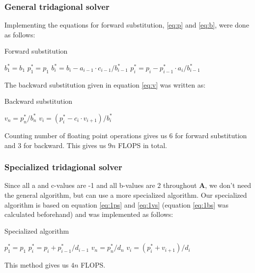 \documentclass[12pt,a4paper]{article}
\newcommand{\s}{^{*}}
\newcommand{\V}[1]{\mathbf{#1}}
\begin{document}
\subsubsection*{General tridagional solver}
Implementing the equations for forward substitution, \eqref{eq:p} and \eqref{eq:b}, were done as follows: 
\begin{algorithm}[H]
\small
\caption{Forward substitution}\label{alg:tri_forward}
\begin{algorithmic}[1]
\State $b_1^* = b_1$
\State $p_1^* = p_1$
\State $b_i^* = b_i - a_{i-1}\cdot c_{i-1}/b_{i-1}^*$
\State $p_i^* = p_i - p_{i-1}^*\cdot a_i/b_{i-1}^*$
\EndFor
\end{algorithmic}
\end{algorithm}
The backward substitution given in equation \eqref{eq:v} was written as:
\begin{algorithm}[H]
\small
\caption{Backward substitution}\label{alg:tri_backward}
\begin{algorithmic}[1]
\State $v_n = p_n\s/b_n\s$
\State $v_i = (p_i\s - c_i \cdot v_{i+1})/b_i\s$
\EndFor
\end{algorithmic}
\end{algorithm}
Counting number of floating point operations gives us 6 for forward substitution and 3 for backward. This gives us $9n$ FLOPS in total.
\subsubsection*{Specialized tridagional solver}
Since all a and c-values are -1 and all b-values are 2 throughout $\V{A}$, we don't need the general algorithm, but can use a more specialized algorithm. Our specialized algorithm is based on equation \eqref{eq:1ps} and \eqref{eq:1vs} (equation \eqref{eq:1bs} was calculated beforehand) and was implemented as follows:
\begin{algorithm}[H]
\small
\caption{Specialized algorithm}\label{alg:tri_special}
\begin{algorithmic}[1]
\State $p_1^* = p_1$
 
\State $p_i^* = p_i + p_{i-1}^*/d_{i-1}$
\EndFor
\State $v_n = p_n^*/d_n$
 
\State $v_i = (p_i^* + v_{i+1})/d_i$ 
\EndFor
\end{algorithmic}
\end{algorithm}
This method gives us $4n$ FLOPS.
\end{document}
